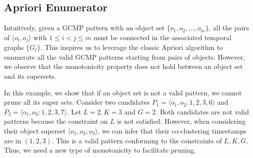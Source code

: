 %
%

\subsection{Apriori Enumerator}
Intuitively, given a GCMP pattern with an object set $\{o_1,o_2,\ldots,o_m\}$, 
all the pairs of $\langle o_i,o_j \rangle$ with $1\leq i<j\leq m$ must 
be connected in the associated temporal graphs $\{G_t\}$. This inspires us to leverage the classic Apriori algorithm to enumerate all the valid GCMP patterns starting from pairs of objects. However, we observe that the monotonicity property does not hold between an object set and its supersets.

\begin{example}
In this example, we show that if an object set is not a valid pattern, we cannot prune all its super sets.
Consider two candidates $P_1=\langle o_1,o_2:1,2,3,6 \rangle$ and $P_2=\langle o_1,o_3:1,2,3,7 \rangle$. 
Let $L=2,K=3$ and $G=2$. Both candidates are not valid patterns because the constraint on $L$ is not satisfied. 
However, when considering their object superset $\langle o_1,o_2,o_3 \rangle$, we can infer that their co-clustering timestamps are in $(1,2,3)$. This is a valid pattern conforming to the constraints of $L,K,G$. Thus, we need a new type of monotonicity to facilitate pruning.
\end{example}   


